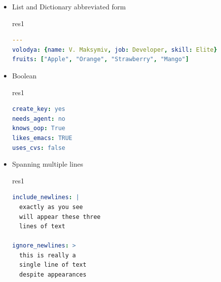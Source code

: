 \documentclass[pdf, 8pt, unicode, t]{beamer} %
\begin{document}
\begin{frame}[fragile,label=yaml3]
\begin{columns}[t,onlytextwidth]
\begin{itemize}
\item List and Dictionary abbreviated form
  \begin{beamercolorbox}[wd=0.9\textwidth,sep=-1.0em,rounded=true,shadow=true,center]{res1}
  \begin{lstlisting}[language=yaml]
---
volodya: {name: V. Maksymiv, job: Developer, skill: Elite}
fruits: ["Apple", "Orange", "Strawberry", "Mango"]
  \end{lstlisting}
  \end{beamercolorbox}

\item Boolean
  \begin{beamercolorbox}[wd=0.9\textwidth,sep=-1.0em,rounded=true,shadow=true,center]{res1}
  \begin{lstlisting}[language=yaml]
create_key: yes
needs_agent: no
knows_oop: True
likes_emacs: TRUE
uses_cvs: false
  \end{lstlisting}
  \end{beamercolorbox}

\item Spanning multiple lines
  \begin{beamercolorbox}[wd=0.9\textwidth,sep=-1.0em,rounded=true,shadow=true,center]{res1}
  \begin{lstlisting}[language=yaml]
include_newlines: |
  exactly as you see
  will appear these three
  lines of text

ignore_newlines: >
  this is really a
  single line of text
  despite appearances
  \end{lstlisting}
  \end{beamercolorbox}

\end{itemize}

\end{columns}

\end{frame}
\end{document}
